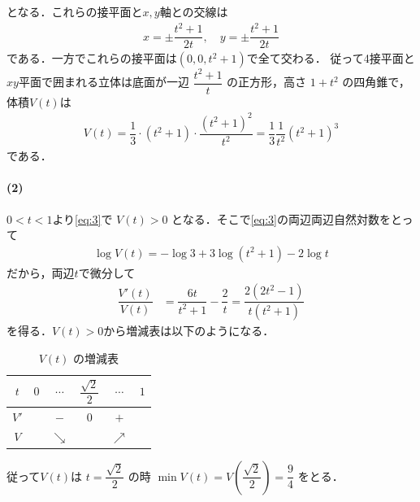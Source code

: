 \documentclass[../../main.tex]{subfiles}
\begin{document}
となる．これらの接平面と$x, y$軸との交線は
\begin{align}
  x = \pm\dfrac{t^2+1}{2t}, \quad y = \pm\dfrac{t^2+1}{2t} \label{eq:2}
\end{align}
である．一方でこれらの接平面は$(0, 0, t^2+1)$で全て交わる．
従って4接平面と$xy$平面で囲まれる立体は底面が一辺 $\dfrac{t^2+1}{t}$ の正方形，高さ $1+t^2$ の四角錐で，体積$V(t)$は
\begin{align}
  V(t)
  = \dfrac{1}{3} \cdot (t^2+1) \cdot \dfrac{(t^2+1)^2}{t^2}
  = \dfrac{1}{3} \dfrac{1}{t^2} (t^2+1)^3 \label{eq:3}
\end{align}
である．

\paragraph{(2)}

$0<t<1$より\cref{eq:3}で $V(t) > 0$ となる．そこで\cref{eq:3}の両辺両辺自然対数をとって
\begin{align}
  \log V(t) = -\log 3 + 3 \log(t^2+1) - 2 \log t \label{eq:4}
\end{align}
だから，両辺$t$で微分して
\begin{align}
  \dfrac{V'(t)}{V(t)} &= \dfrac{6t}{t^2+1} - \dfrac{2}{t} = \dfrac{2(2t^2-1)}{t(t^2+1)}
\end{align}
を得る．$V(t) > 0$から増減表は以下のようになる．

\begin{table}[htb]
  \centering
  \caption{$V(t)$ の増減表}
  \begin{tabular}{|c|c|c|c|c|c|} \hline
    $t$ & $0$ & $\cdots$ & $\dfrac{\sqrt{2}}{2}$ & $\cdots$ & $1$ \\ \hline
    $V'$ & & $-$ & $0$ & $+$ & \\ \hline
    $V$ & & $\searrow$ & & $\nearrow$ & \\ \hline
  \end{tabular}
\end{table}

従って$V(t)$は $t = \dfrac{\sqrt{2}}{2}$ の時 $\min V(t) = V(\dfrac{\sqrt{2}}{2})= \dfrac{9}{4}$ をとる．
\end{document}
